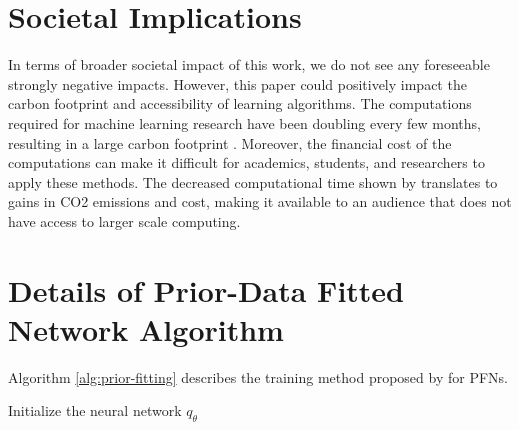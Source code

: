 \documentclass{article}
\begin{document}
\section{Societal Implications}
\label{sec:impacts}
In terms of broader societal impact of this work, we do not see any foreseeable strongly negative impacts.
However, this paper could positively impact the carbon footprint and accessibility of learning algorithms. The computations required for machine learning research have been doubling every few months, resulting in a large carbon footprint \citep{schwartz2020green}. Moreover, the financial cost of the computations can make it difficult for academics, students, and researchers to apply these methods.
The decreased computational time shown by \methodname{} translates to gains in CO2 emissions and cost, making it available to an audience that does not have access to larger scale computing. 


\section{Details of Prior-Data Fitted Network Algorithm} %
\label{app:pfn}
Algorithm \ref{alg:prior-fitting} describes the training method proposed by \citet{muller-iclr2022} for PFNs.

\begin{algorithm}[H]
\SetAlgoLined
{}
 Initialize the neural network $q_\theta$\;
 \caption{Meta-Training of a PFN \citep{muller-iclr2022}}
 \label{alg:prior-fitting}
\end{algorithm}
\end{document}

